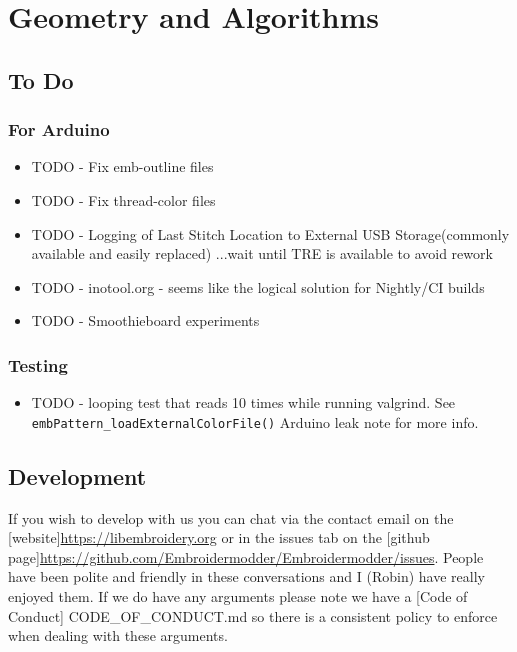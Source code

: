 
\chapter{Geometry and Algorithms}

\section{To Do}

\subsection{For Arduino}

\begin{itemize}
\item TODO - Fix emb-outline files
\item TODO - Fix thread-color files
\item TODO - Logging of Last Stitch Location to External USB Storage(commonly available and easily replaced) ...wait until TRE is available to avoid rework
\item TODO - inotool.org - seems like the logical solution for Nightly/CI builds
\item TODO - Smoothieboard experiments
\end{itemize}

\subsection{Testing}

\begin{itemize}
\item TODO - looping test that reads 10 times while running valgrind. See \texttt{embPattern\_loadExternalColorFile()} Arduino leak note for more info.
\end{itemize}


\section{Development}

If you wish to develop with us you can chat via the contact email
on the [website]\url{https://libembroidery.org} or in the issues tab on the
[github page]\url{https://github.com/Embroidermodder/Embroidermodder/issues}.
People have been polite and friendly in these conversations and I (Robin)
have really enjoyed them.
If we do have any arguments please note we have a
[Code of Conduct] CODE\_OF\_CONDUCT.md so there is a consistent policy to
enforce when dealing with these arguments.

